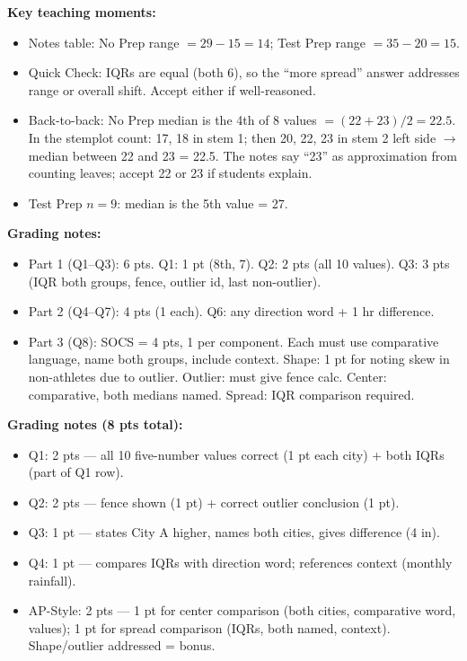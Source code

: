 \documentclass[10pt]{article}
\begin{document}
\boxguard
\begin{teachernote}
\textbf{Key teaching moments:}
\begin{itemize}[itemsep=2pt]
  \item Notes table: No Prep range $= 29 - 15 = 14$; Test Prep range $= 35 - 20 = 15$.
  \item Quick Check: IQRs are equal (both 6), so the ``more spread'' answer addresses range or overall shift. Accept either if well-reasoned.
  \item Back-to-back: No Prep median is the 4th of 8 values $= (22+23)/2 = 22.5$. In the stemplot count: 17, 18 in stem 1; then 20, 22, 23 in stem 2 left side $\to$ median between 22 and 23 = 22.5. The notes say ``23'' as approximation from counting leaves; accept 22 or 23 if students explain.
  \item Test Prep $n=9$: median is the 5th value = 27.
\end{itemize}
\end{teachernote}

\boxguard
\begin{teachernote}
\textbf{Grading notes:}
\begin{itemize}[itemsep=2pt]
  \item Part 1 (Q1--Q3): 6 pts. Q1: 1 pt (8th, 7). Q2: 2 pts (all 10 values). Q3: 3 pts (IQR both groups, fence, outlier id, last non-outlier).
  \item Part 2 (Q4--Q7): 4 pts (1 each). Q6: any direction word + 1 hr difference.
  \item Part 3 (Q8): SOCS = 4 pts, 1 per component. Each must use comparative language, name both groups, include context. Shape: 1 pt for noting skew in non-athletes due to outlier. Outlier: must give fence calc. Center: comparative, both medians named. Spread: IQR comparison required.
\end{itemize}
\end{teachernote}

\boxguard
\begin{teachernote}
\textbf{Grading notes (8 pts total):}
\begin{itemize}[itemsep=2pt]
  \item Q1: 2 pts --- all 10 five-number values correct (1 pt each city) + both IQRs (part of Q1 row).
  \item Q2: 2 pts --- fence shown (1 pt) + correct outlier conclusion (1 pt).
  \item Q3: 1 pt --- states City A higher, names both cities, gives difference (4 in).
  \item Q4: 1 pt --- compares IQRs with direction word; references context (monthly rainfall).
  \item AP-Style: 2 pts --- 1 pt for center comparison (both cities, comparative word, values);
        1 pt for spread comparison (IQRs, both named, context). Shape/outlier addressed = bonus.
\end{itemize}
\end{teachernote}
\end{document}
